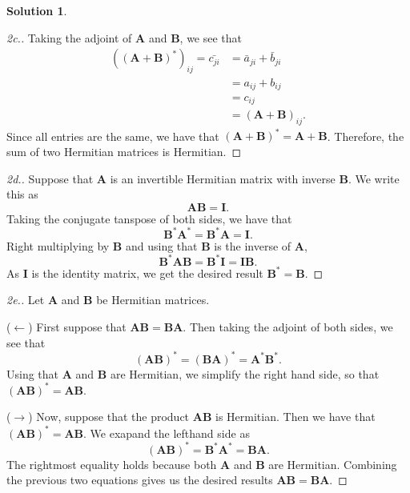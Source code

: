\documentclass[12pt]{article}
\renewcommand{\vec}[1]{\mathbf{#1}}
\theoremstyle{definition}
\newtheorem{sol}{Solution}
\theoremstyle{remark}
\begin{document}
\begin{sol}
\begin{proof}[2c.]
Taking the adjoint of $\vec{A}$ and $\vec{B}$, we see that
\begin{align}
    ((\vec{A}+\vec{B})^*)_{ij} = \bar{c_{ji}} &= \bar{a}_{ji} + \bar{b}_{ji}\\
                                              &= a_{ij} + b_{ij}\\
                                              &= c_{ij}\\
                                              &=  (\vec{A}+\vec{B})_{ij}.
\end{align}
Since all entries are the same, we have that $(\vec{A} + \vec{B})^* = \vec{A} + \vec{B}$. Therefore, the sum of two Hermitian matrices is Hermitian.
    \end{proof}

    \begin{proof}[2d.] Suppose that $\vec{A}$ is an invertible Hermitian matrix with inverse $\vec{B}$. We write this as
        \begin{equation}
            \vec{AB} = \vec{I}.
        \end{equation}
    Taking the conjugate tanspose of both sides, we have that
    \begin{equation}
        \vec{B}^*\vec{A}^* = \vec{B}^*\vec{A} = \vec{I}.
    \end{equation}
    Right multiplying by $\vec{B}$ and using that $\vec{B}$ is the inverse of $\vec{A}$,
    \begin{equation}
        \vec{B}^*\vec{A}\vec{B} = \vec{B}^* \vec{I} = \vec{I}\vec{B}.
    \end{equation}
    As $\vec{I}$ is the identity matrix, we get the desired result $\vec{B}^* = \vec{B}$.
    \end{proof}

    \begin{proof}[2e.]Let $\vec{A}$ and $\vec{B}$ be Hermitian matrices.

        ($\leftarrow$) First suppose that $\vec{AB} = \vec{BA}$. Then taking the adjoint of both sides, we see that
        \begin{equation}
            (\vec{AB})^* = (\vec{BA})^* = \vec{A}^*\vec{B}^*.
        \end{equation}
    Using that $\vec{A}$ and $\vec{B}$ are Hermitian, we simplify the right hand side, so that $(\vec{AB})^* = \vec{AB}$.

    ($\rightarrow$) Now, suppose that the product $\vec{AB}$ is Hermitian. Then we have that $(\vec{AB})^* = \vec{AB}$. We exapand the lefthand side as
    \begin{equation}
        (\vec{AB})^* = \vec{B}^*\vec{A}^* = \vec{B}\vec{A}.
    \end{equation}
    The rightmost equality holds because both $\vec{A}$ and $\vec{B}$ are Hermitian. Combining the previous two equations gives us the desired results $\vec{AB} = \vec{BA}$.
    \end{proof}
\end{sol}
\end{document}
